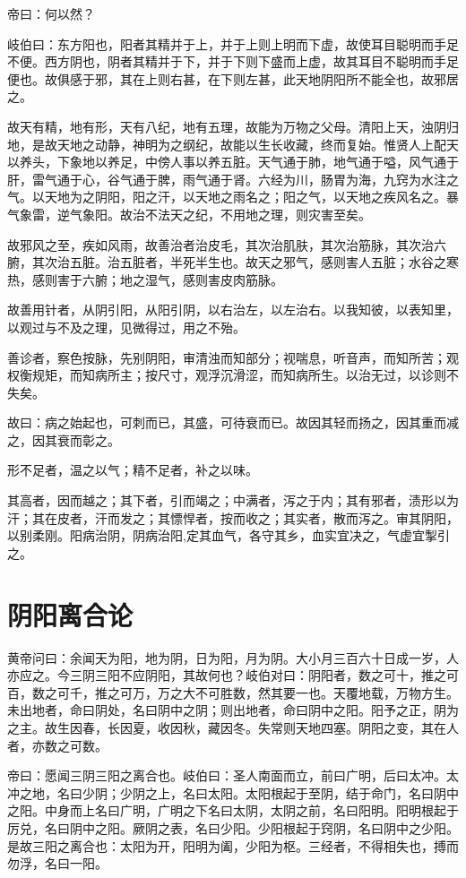 \documentclass{article}%
\begin{document}
帝曰：何以然？

岐伯曰：东方阳也，阳者其精并于上，并于上则上明而下虚，故使耳目聪明而手足不便。西方阴也，阴者其精并于下，并于下则下盛而上虚，故其耳目不聪明而手足便也。故俱感于邪，其在上则右甚，在下则左甚，此天地阴阳所不能全也，故邪居之。

故天有精，地有形，天有八纪，地有五理，故能为万物之父母。清阳上天，浊阴归地，是故天地之动静，神明为之纲纪，故能以生长收藏，终而复始。惟贤人上配天以养头，下象地以养足，中傍人事以养五脏。天气通于肺，地气通于嗌，风气通于肝，雷气通于心，谷气通于脾，雨气通于肾。六经为川，肠胃为海，九窍为水注之气。以天地为之阴阳，阳之汗，以天地之雨名之；阳之气，以天地之疾风名之。暴气象雷，逆气象阳。故治不法天之纪，不用地之理，则灾害至矣。

故邪风之至，疾如风雨，故善治者治皮毛，其次治肌肤，其次治筋脉，其次治六腑，其次治五脏。治五脏者，半死半生也。故天之邪气，感则害人五脏；水谷之寒热，感则害于六腑；地之湿气，感则害皮肉筋脉。

故善用针者，从阴引阳，从阳引阴，以右治左，以左治右。以我知彼，以表知里，以观过与不及之理，见微得过，用之不殆。

善诊者，察色按脉，先别阴阳，审清浊而知部分；视喘息，听音声，而知所苦；观权衡规矩，而知病所主；按尺寸，观浮沉滑涩，而知病所生。以治无过，以诊则不失矣。

故曰：病之始起也，可刺而已，其盛，可待衰而已。故因其轻而扬之，因其重而减之，因其衰而彰之。

形不足者，温之以气；精不足者，补之以味。

其高者，因而越之；其下者，引而竭之；中满者，泻之于内；其有邪者，渍形以为汗；其在皮者，汗而发之；其慓悍者，按而收之；其实者，散而泻之。审其阴阳，以别柔刚。阳病治阴，阴病治阳,定其血气，各守其乡，血实宜决之，气虚宜掣引之。
\section{阴阳离合论}
黄帝问曰：余闻天为阳，地为阴，日为阳，月为阴。大小月三百六十日成一岁，人亦应之。今三阴三阳不应阴阳，其故何也？岐伯对曰：阴阳者，数之可十，推之可百，数之可千，推之可万，万之大不可胜数，然其要一也。天覆地载，万物方生。未出地者，命曰阴处，名曰阴中之阴；则出地者，命曰阴中之阳。阳予之正，阴为之主。故生因春，长因夏，收因秋，藏因冬。失常则天地四塞。阴阳之变，其在人者，亦数之可数。

帝曰：愿闻三阴三阳之离合也。岐伯曰：圣人南面而立，前曰广明，后曰太冲。太冲之地，名曰少阴；少阴之上，名曰太阳。太阳根起于至阴，结于命门，名曰阴中之阳。中身而上名曰广明，广明之下名曰太阴，太阴之前，名曰阳明。阳明根起于厉兑，名曰阴中之阳。厥阴之表，名曰少阳。少阳根起于窍阴，名曰阴中之少阳。是故三阳之离合也：太阳为开，阳明为阖，少阳为枢。三经者，不得相失也，搏而勿浮，名曰一阳。
\end{document}
